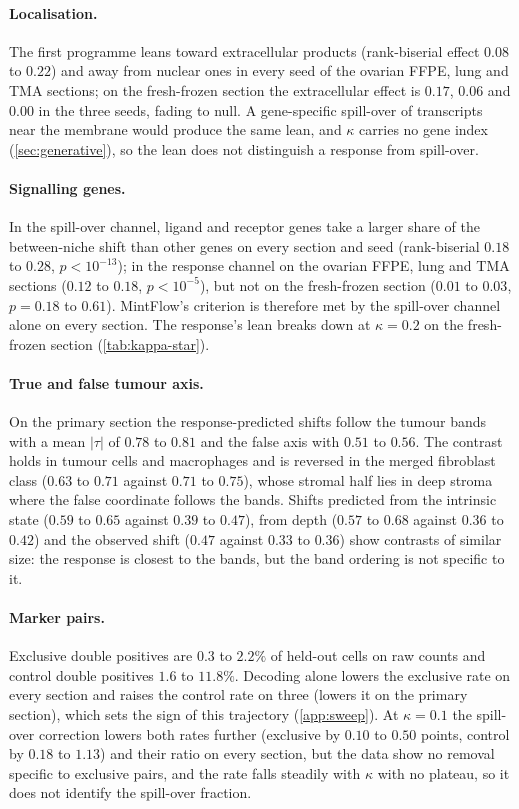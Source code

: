 \paragraph{Localisation.} The first programme leans toward extracellular products (rank-biserial effect $0.08$ to $0.22$) and away from nuclear ones in every seed of the ovarian FFPE, lung and TMA sections; on the fresh-frozen section the extracellular effect is $0.17$, $0.06$ and $0.00$ in the three seeds, fading to null. A gene-specific spill-over of transcripts near the membrane would produce the same lean, and $\kappa$ carries no gene index (\cref{sec:generative}), so the lean does not distinguish a response from spill-over.

\paragraph{Signalling genes.} In the spill-over channel, ligand and receptor genes take a larger share of the between-niche shift than other genes on every section and seed (rank-biserial $0.18$ to $0.28$, $p < 10^{-13}$); in the response channel on the ovarian FFPE, lung and TMA sections ($0.12$ to $0.18$, $p < 10^{-5}$), but not on the fresh-frozen section ($0.01$ to $0.03$, $p = 0.18$ to $0.61$). MintFlow's criterion is therefore met by the spill-over channel alone on every section. The response's lean breaks down at $\kappa = 0.2$ on the fresh-frozen section (\cref{tab:kappa-star}).

\paragraph{True and false tumour axis.} On the primary section the response-predicted shifts follow the tumour bands with a mean $|\tau|$ of $0.78$ to $0.81$ and the false axis with $0.51$ to $0.56$. The contrast holds in tumour cells and macrophages and is reversed in the merged fibroblast class ($0.63$ to $0.71$ against $0.71$ to $0.75$), whose stromal half lies in deep stroma where the false coordinate follows the bands. Shifts predicted from the intrinsic state ($0.59$ to $0.65$ against $0.39$ to $0.47$), from depth ($0.57$ to $0.68$ against $0.36$ to $0.42$) and the observed shift ($0.47$ against $0.33$ to $0.36$) show contrasts of similar size: the response is closest to the bands, but the band ordering is not specific to it.

\paragraph{Marker pairs.} Exclusive double positives are $0.3$ to $2.2\%$ of held-out cells on raw counts and control double positives $1.6$ to $11.8\%$. Decoding alone lowers the exclusive rate on every section and raises the control rate on three (lowers it on the primary section), which sets the sign of this trajectory (\cref{app:sweep}). At $\kappa = 0.1$ the spill-over correction lowers both rates further (exclusive by $0.10$ to $0.50$ points, control by $0.18$ to $1.13$) and their ratio on every section, but the data show no removal specific to exclusive pairs, and the rate falls steadily with $\kappa$ with no plateau, so it does not identify the spill-over fraction.

